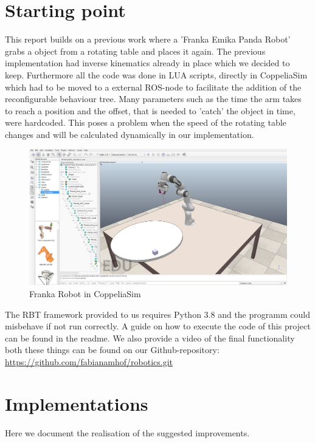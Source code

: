 \documentclass[report]{iisthesis}
\begin{document}
\setcounter{chapter}{1}
\setcounter{section}{0}
\chapter{Starting point}
This report builds on a previous work where a 'Franka Emika Panda Robot' grabs a object from a rotating table and places it again.
The previous implementation had inverse kinematics already in place which we decided to keep. Furthermore all the code was done in LUA scripts, directly in CoppeliaSim which had to be moved to a external ROS-node to facilitate the addition of the reconfigurable behaviour tree.
Many parameters such as the time the arm takes to reach a position and the offset, that is needed to 'catch' the object in time, were hardcoded. This poses a problem when the speed of the rotating table changes and will be calculated dynamically in our implementation.\\

\begin{figure}[h]
    \caption{Franka Robot in CoppeliaSim}
    \includegraphics[width=\textwidth]{arm_coppeliaSim}
\end{figure}
\noindent
The RBT framework provided to us requires Python 3.8 and the programm could misbehave if not run correctly.
A guide on how to execute the code of this project can be found in the readme. 
We also provide a video of the final functionality both these things can be found on our Github-repository: \\
\url{https://github.com/fabianamhof/robotics.git} 

\setcounter{chapter}{2}
\setcounter{section}{0}
\chapter{Implementations}
Here we document the realisation of the suggested improvements.
\end{document}
